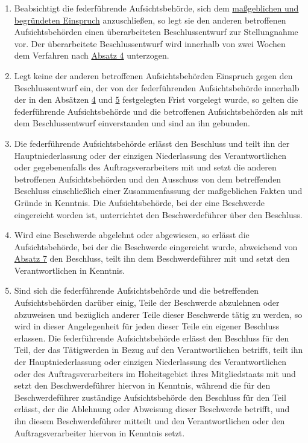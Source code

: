 \begin{enumerate}
  \item Beabsichtigt die federführende Aufsichtsbehörde, sich dem \hyperref[itm:04-27]{maßgeblichen und begründeten Einspruch} anzuschließen,
   so legt sie den anderen betroffenen Aufsichtsbehörden einen überarbeiteten Beschlussentwurf zur Stellungnahme vor.
   Der überarbeitete Beschlussentwurf wird innerhalb von zwei Wochen dem Verfahren nach \hyperref[itm:60-4]{Absatz 4}
   unterzogen.
  \label{itm:60-5}

  \item Legt keine der anderen betroffenen Aufsichtsbehörden Einspruch gegen den Beschlussentwurf ein, der von der
   federführenden Aufsichtsbehörde innerhalb der in den Absätzen \hyperref[itm:60-4]{4} und \hyperref[itm:60-5]
   {5} festgelegten Frist vorgelegt wurde, so gelten die federführende Aufsichtsbehörde und die betroffenen
   Aufsichtsbehörden als mit dem Beschlussentwurf einverstanden und sind an ihn gebunden.
  \label{itm:60-6}

  \item Die federführende Aufsichtsbehörde erlässt den Beschluss und teilt ihn der Hauptniederlassung oder der einzigen
   Niederlassung des Verantwortlichen oder gegebenenfalls des Auftragsverarbeiters mit und setzt die anderen
   betroffenen Aufsichtsbehörden und den Ausschuss von dem betreffenden Beschluss einschließlich einer Zusammenfassung
   der maßgeblichen Fakten und Gründe in Kenntnis. Die Aufsichtsbehörde, bei der eine Beschwerde eingereicht worden
   ist, unterrichtet den Beschwerdeführer über den Beschluss.
  \label{itm:60-7}

  \item Wird eine Beschwerde abgelehnt oder abgewiesen, so erlässt die Aufsichtsbehörde, bei der die Beschwerde
   eingereicht wurde, abweichend von \hyperref[itm:60-7]{Absatz 7} den Beschluss, teilt ihn dem Beschwerdeführer mit
   und setzt den Verantwortlichen in Kenntnis.
  \label{itm:60-8}

  \item Sind sich die federführende Aufsichtsbehörde und die betreffenden Aufsichtsbehörden darüber einig, Teile der
   Beschwerde abzulehnen oder abzuweisen und bezüglich anderer Teile dieser Beschwerde tätig zu werden, so wird in
   dieser Angelegenheit für jeden dieser Teile ein eigener Beschluss erlassen. Die federführende Aufsichtsbehörde
   erlässt den Beschluss für den Teil, der das Tätigwerden in Bezug auf den Verantwortlichen betrifft, teilt ihn der
   Hauptniederlassung oder einzigen Niederlassung des Verantwortlichen oder des Auftragsverarbeiters im Hoheitsgebiet
   ihres Mitgliedstaats mit und setzt den Beschwerdeführer hiervon in Kenntnis, während die für den Beschwerdeführer
   zuständige Aufsichtsbehörde den Beschluss für den Teil erlässt, der die Ablehnung oder Abweisung dieser Beschwerde
   betrifft, und ihn diesem Beschwerdeführer mitteilt und den Verantwortlichen oder den Auftragsverarbeiter hiervon in
   Kenntnis setzt.
  \label{itm:60-9}


\end{enumerate}
